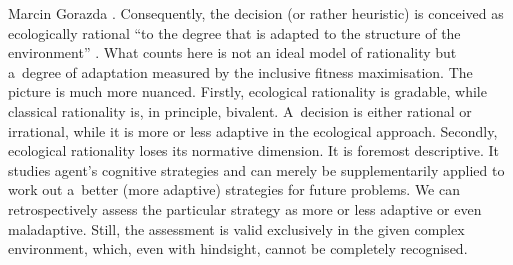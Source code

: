 \begin{artengenv}{Marcin Gorazda}
\parencite[][]{gigerenzer_adaptive_2000}. %
 Consequently, the decision (or rather heuristic) is conceived as ecologically rational ``to the degree that is adapted to the structure of the environment'' 
\parencite[][]{gigerenzer_ecological_2012}. %
 What counts here is not an ideal model of rationality but a~degree of adaptation measured by the inclusive fitness maximisation. The picture is much more nuanced. Firstly, ecological rationality is gradable, while classical rationality is, in principle, bivalent. A~decision is either rational or irrational, while it is more or less adaptive in the ecological approach. Secondly, ecological rationality loses its normative dimension. It is foremost descriptive. It studies agent's cognitive strategies and can merely be supplementarily applied to work out a~better (more adaptive) strategies for future problems. We can retrospectively assess the particular strategy as more or less adaptive or even maladaptive. Still, the assessment is valid exclusively in the given complex environment, which, even with hindsight, cannot be completely recognised.


\end{artengenv}

